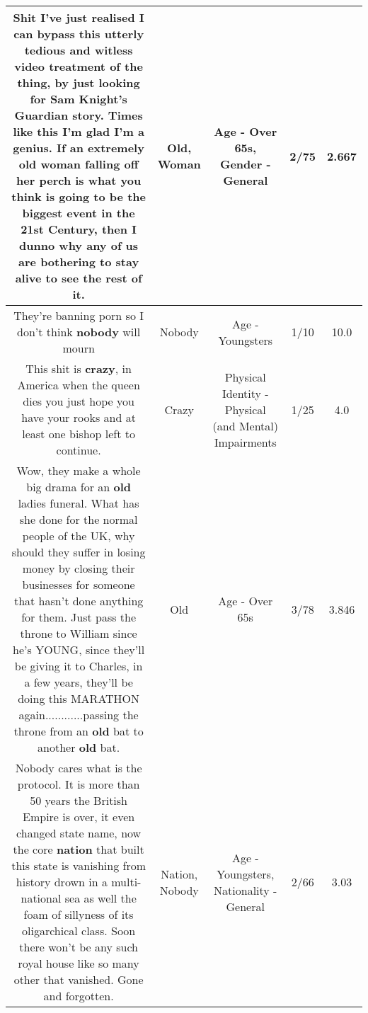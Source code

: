 \documentclass[11pt]{article}
\newlength\mylength
\begin{document}
\begin{center}
\begin{longtable}{|C{.65\mylength}|C{.30\mylength}|C{.12\mylength}|C{.12\mylength}|C{.12\mylength}|}
  \small Shit I've just realised I can bypass this utterly tedious and witless video treatment of the thing, by just looking for Sam Knight's Guardian story. Times like this I'm glad I'm a genius. If an extremely \textbf{old} \textbf{woman} falling off her perch is what you think is going to be the biggest event in the 21st Century, then I dunno why any of us are bothering to stay alive to see the rest of it.\normalsize   & Old, Woman & Age - Over 65s, Gender - General & 2/75 & 2.667 \\  \hline
  \small They're banning porn so I don't think \textbf{nobody} will mourn\normalsize   & Nobody & Age - Youngsters & 1/10 & 10.0 \\  \hline
  \small This shit is \textbf{crazy}, in America when the queen dies you just hope you have your rooks and at least one bishop left to continue.\normalsize   & Crazy & Physical Identity - Physical (and Mental) Impairments & 1/25 & 4.0 \\  \hline
  \small Wow, they make a whole big drama for an \textbf{old} ladies funeral. What has she done for the normal people of the UK, why should they suffer in losing money by closing their businesses for someone that hasn't done anything for them. Just pass the throne to William since he's YOUNG, since they'll be giving it to Charles, in a few years, they'll be doing this MARATHON again............passing the throne from an \textbf{old} bat to another \textbf{old} bat.\normalsize   & Old & Age - Over 65s & 3/78 & 3.846 \\  \hline
  \small Nobody cares what is the protocol. It is more than 50 years the British Empire is over, it even changed state name, now the core \textbf{nation} that built this state is vanishing from history drown in a multi-national sea as well the foam of sillyness of its oligarchical class. Soon there won't be any such royal house like so many other that vanished. Gone and forgotten.\normalsize   & Nation, Nobody & Age - Youngsters, Nationality - General & 2/66 & 3.03 \\  \hline

\end{longtable}
\end{center}
\end{document}
